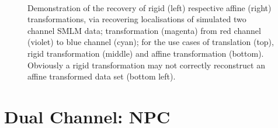 \documentclass[11pt, a4paper, oneside, twocolumn]{report}
\renewcommand{\t}{\todo}
\begin{document}
\begin{figure}[!t]
\begin{subfigure}[t!]{0.44\textwidth}
  \end{subfigure}
  ~
  \begin{subfigure}[t!]{0.44\textwidth}
    \centering
  \end{subfigure}
  \caption{Demonstration of the recovery of rigid (left) respective
    affine (right) transformations, via recovering localisations of
    simulated two channel SMLM data; transformation (magenta) from red
    channel (violet) to blue channel (cyan); for the use cases of
    translation (top), rigid transformation (middle) and affine
    transformation (bottom). Obviously a rigid transformation may not
    correctly reconstruct an affine transformed data set (bottom
    left).}
  \label{f:transim}
\end{figure}


\clearpage\section{Dual Channel: NPC}

\t{Dual Channel: NPC}
\end{document}
